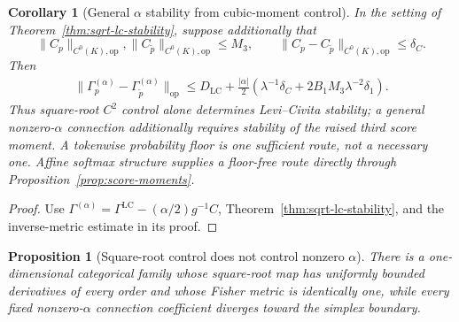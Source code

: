 \documentclass[11pt]{article}
\newtheorem{proposition}[theorem]{Proposition}
\newtheorem{corollary}[theorem]{Corollary}
\theoremstyle{definition}
\theoremstyle{remark}
\newcommand{\LC}{\mathrm{LC}}
\newcommand{\op}{\mathrm{op}}
\begin{document}
\begin{corollary}[General $\alpha$ stability from cubic-moment control]\label{cor:alpha-moment-stability}
In the setting of Theorem~\ref{thm:sqrt-lc-stability}, suppose additionally that
\begin{equation}
    \|C_p\|_{C^0(K),\op},\|C_{\widetilde p}\|_{C^0(K),\op}\le M_3,
    \qquad
    \|C_p-C_{\widetilde p}\|_{C^0(K),\op}\le\delta_C.
\end{equation}
Then
\begin{equation}
\begin{split}
    \|\Gamma_p^{(\alpha)}-\Gamma_{\widetilde p}^{(\alpha)}\|_{\op}
    \le D_{\LC}+\frac{|\alpha|}{2}\left(
        \lambda^{-1}\delta_C
        +2B_1M_3\lambda^{-2}\delta_1
    \right).
\end{split}
\label{eq:general-alpha-moment-bound}
\end{equation}
Thus square-root $C^2$ control alone determines Levi--Civita stability; a general nonzero-$\alpha$ connection additionally requires stability of the raised third score moment. A tokenwise probability floor is one sufficient route, not a necessary one. Affine softmax structure supplies a floor-free route directly through Proposition~\ref{prop:score-moments}.
\end{corollary}

\begin{proof}
Use $\Gamma^{(\alpha)}=\Gamma^{\LC}-(\alpha/2)g^{-1}C$, Theorem~\ref{thm:sqrt-lc-stability}, and the inverse-metric estimate in its proof.
\end{proof}

\begin{proposition}[Square-root control does not control nonzero $\alpha$]\label{prop:boundary-alpha-separation}
There is a one-dimensional categorical family whose square-root map has uniformly bounded derivatives of every order and whose Fisher metric is identically one, while every fixed nonzero-$\alpha$ connection coefficient diverges toward the simplex boundary.
\end{proposition}
\end{document}
